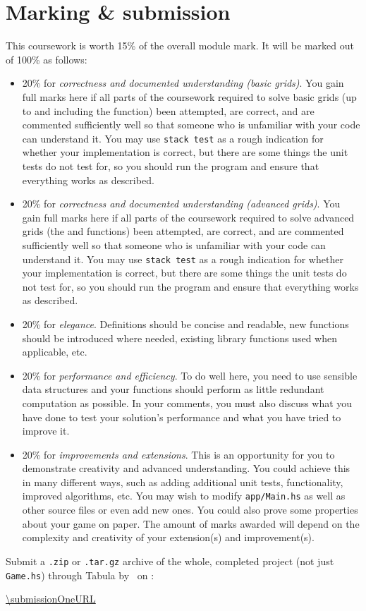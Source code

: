 
\section{Marking \& submission}

This coursework is worth 15\% of the overall module mark. It will be marked out of 100\% as follows:
\begin{itemize}
	\item 20\% for \emph{correctness and documented understanding (basic grids)}. You gain full marks here if all parts of the coursework required to solve basic grids (up to and including the  function) been attempted, are correct, and are commented sufficiently well so that someone who is unfamiliar with your code can understand it. You may use \texttt{\small stack test} as a rough indication for whether your implementation is correct, but there are some things the unit tests do not test for, so you should run the program and ensure that everything works as described.
	
	\item 20\% for \emph{correctness and documented understanding (advanced grids)}. You gain full marks here if all parts of the coursework required to solve advanced grids (the  and  functions) been attempted, are correct, and are commented sufficiently well so that someone who is unfamiliar with your code can understand it. You may use \texttt{\small stack test} as a rough indication for whether your implementation is correct, but there are some things the unit tests do not test for, so you should run the program and ensure that everything works as described.
	
	\item 20\% for \emph{elegance}. Definitions should be concise and readable, new functions should be introduced where needed, existing library functions used when applicable, etc.
	 
	\item 20\% for \emph{performance and efficiency}. To do well here, you need to use sensible data structures and your functions should perform as little redundant computation as possible. In your comments, you must also discuss what you have done to test your solution's performance and what you have tried to improve it. %
	
	\item 20\% for \emph{improvements and extensions}. This is an opportunity for you to demonstrate creativity and advanced understanding. You could achieve this in many different ways, such as adding additional unit tests, functionality, improved algorithms, etc. You may wish to modify \texttt{\small app/Main.hs} as well as other source files or even add new ones. You could also prove some properties about your game on paper. The amount of marks awarded will depend on the complexity and creativity of your extension(s) and improvement(s).
\end{itemize}
Submit a \texttt{\small .zip} or \texttt{\small .tar.gz} archive of the whole, completed project (not just \texttt{\small Game.hs}) through Tabula by \deadlineOneTime\ on \deadlineOneDate:
\begin{center} 
	\url{\submissionOneURL}
\end{center}

